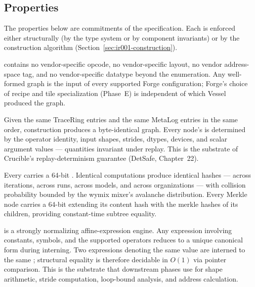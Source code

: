\subsection{Properties}
\label{sec:ir001-properties}

The properties below are commitments of the  specification.
Each is enforced either structurally (by the type system or by component invariants) or by the construction algorithm (Section~\ref{sec:ir001-construction}).

\begin{property}
\label{prop:ir001-vendor-neutral}
 contains no vendor-specific opcode, no vendor-specific layout, no vendor address-space tag, and no vendor-specific datatype beyond the  enumeration.
Any well-formed  graph is the input of every supported Forge configuration; Forge's choice of recipe and tile specialization (Phase~E) is independent of which Vessel produced the graph.
\end{property}

\begin{property}
\label{prop:ir001-determinism}
Given the same TraceRing entries and the same MetaLog entries in the same order,  construction produces a byte-identical graph.
Every node's  is determined by the operator identity, input shapes, strides, dtypes, devices, and scalar argument values --- quantities invariant under replay.
This is the substrate of Crucible's replay-determinism guarantee (DetSafe, Chapter~22).
\end{property}

\begin{property}
\label{prop:ir001-content-addressing}
Every  carries a 64-bit .
Identical computations produce identical hashes --- across iterations, across runs, across models, and across organizations --- with collision probability bounded by the wymix mixer's avalanche distribution.
Every Merkle node carries a 64-bit  extending its content hash with the merkle hashes of its children, providing constant-time subtree equality.
\end{property}

\begin{property}
\label{prop:ir001-expr-canonical}
 is a strongly normalizing affine-expression engine.
Any expression involving constants, symbols, and the supported operators reduces to a unique canonical form during interning.
Two expressions denoting the same value are interned to the same ; structural equality is therefore decidable in $O(1)$ via pointer comparison.
This is the substrate that downstream phases use for shape arithmetic, stride computation, loop-bound analysis, and address calculation.
\end{property}


